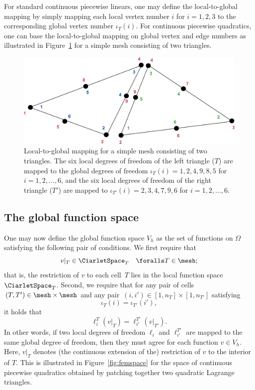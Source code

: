 For standard continuous piecewise linears, one may define the
local-to-global mapping by simply mapping each local vertex number $i$
for $i=1,2,3$ to the corresponding global vertex number
$\iota_T(i)$. For continuous piecewise quadratics, one can base the
local-to-global mapping on global vertex and edge numbers as
illustrated in Figure~\ref{fig:dofmap} for a simple mesh consisting of
two triangles.

\begin{figure}
  \begin{center}
    \includegraphics[width=\largefig]{chapters/kirby-7/pdf/dofmap.pdf}
    \caption{Local-to-global mapping for a simple mesh consisting of
      two triangles. The six local degrees of freedom of the left
      triangle ($T$) are mapped to the global degrees of freedom
      $\iota_T(i) = 1, 2, 4, 9, 8, 5$ for $i = 1, 2, \ldots, 6$, and
      the six local degrees of freedom of the right triangle ($T'$)
      are mapped to $\iota_{T'}(i) = 2, 3, 4, 7, 9, 6$ for $i = 1, 2,
      \ldots, 6$.}
    \label{fig:dofmap}
  \end{center}
\end{figure}

\subsection{The global function space}

One may now define the global function space $V_h$ as the set of
functions on $\Omega$ satisfying the following pair of conditions. We
first require that
\begin{equation}
  v |_T \in \CiarletSpace_T \quad \foralls T \in \mesh;
\end{equation}
that is, the restriction of $v$ to each cell~$T$ lies in the local
function space~$\CiarletSpace_T$. Second, we require that for any pair
of cells $(T, T') \in \mesh \times \mesh$ and any pair~$(i, i') \in
[1,n_T] \times [1,n_{T'}]$ satisfying
\begin{equation}
  \iota_T(i) = \iota_{T'}(i'),
\end{equation}
it holds that
\begin{equation} \label{eq:constraint}
  \ell^T_i(v|_T) = \ell^{T'}_{i'}(v|_{T'}).
\end{equation}
In other words, if two local degrees of freedom $\ell_i$ and
$\ell^{T'}_{i'}$ are mapped to the same global degree of freedom, then
they must agree for each function $v \in V_h$. Here, $v|_T$ denotes
(the continuous extension of the) restriction of $v$ to the interior
of $T$. This is illustrated in Figure~\ref{fig:femspace} for the space
of continuous piecewise quadratics obtained by patching together two
quadratic Lagrange triangles.

